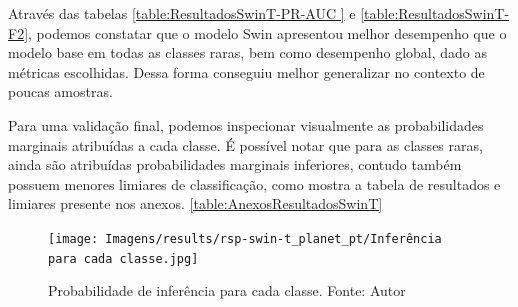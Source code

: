 Através das tabelas \ref{table:ResultadosSwinT-PR-AUC } e \ref{table:ResultadosSwinT-F2}, podemos constatar que o modelo Swin apresentou melhor desempenho que o modelo base em todas as classes raras, bem como desempenho global, dado as métricas escolhidas. Dessa forma conseguiu melhor generalizar no contexto de poucas amostras.

Para uma validação final, podemos inspecionar visualmente as probabilidades marginais atribuídas a cada classe. É possível notar que para as classes raras, ainda são atribuídas probabilidades marginais inferiores, contudo também possuem menores limiares de classificação, como mostra a tabela de resultados e limiares presente nos anexos. \ref{table:AnexosResultadosSwinT}

\begin{figure}[!ht]
    \centering
    \texttt{[image: Imagens/results/rsp-swin-t\_planet\_pt/Inferência para cada classe.jpg]}
    \caption{ Probabilidade de inferência para cada classe.
    Fonte: Autor}
    \label{fig:InferenciaClassesSwin}
\end{figure}  